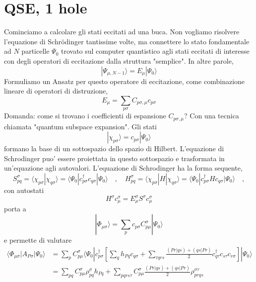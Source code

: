\documentclass{report}
\begin{document}
\section{QSE, 1 hole}

{\color{red}
Cominciamo a calcolare gli stati eccitati ad una buca. Non vogliamo risolvere l'equazione di Schr\"{o}dinger tantissime volte, ma connettere lo stato fondamentale
ad $N$ particelle $\Psi_0$ trovato sul computer quantistico agli stati eccitati di interesse con degli operatori di eccitazione dalla struttura "semplice". In altre parole,
\begin{equation}
| \Psi_{\mu,N-1} \rangle = E_\mu | \Psi_0 \rangle
\end{equation}
Formuliamo un Ansatz per questo operatore di eccitazione, come combinazione lineare di operatori di distruzione,
\begin{equation}
E_\mu = \sum_{p\sigma} C_{p\sigma,\mu} c_{p\sigma} %
\end{equation}
Domanda: come si trovano i coefficienti di espansione $C_{p\sigma,\mu}$? Con una tecnica chiamata "quantum subspace expansion". Gli stati
\begin{equation}
| \chi_{p\sigma} \rangle = c_{p\sigma}  | \Psi_0 \rangle
\end{equation}
formano la base di un sottospazio dello spazio di Hilbert. L'equazione di Schrodinger puo' essere proiettata in questo sottospazio e trasformata in un'equazione
agli autovalori.
}
L'equazione di Schrodinger ha la forma sequente,
\begin{equation}
S^\sigma_{pq} = \langle \chi_{p\sigma} | \chi_{q\sigma} \rangle = \langle \Psi_0 | c^\dagger_{p\sigma} c_{q\sigma} | \Psi_0 \rangle
\quad,\quad
H^\sigma_{pq} = \langle \chi_{p\sigma} | H | \chi_{q\sigma} \rangle = \langle \Psi_0 | c^\dagger_{p\sigma} H c_{q\sigma} | \Psi_0 \rangle
\quad,
\end{equation}
con autostati
\begin{equation}
H^\sigma c_\mu^\sigma = E^\sigma_\mu S^\sigma c_\mu^\sigma
\end{equation}
porta a
\begin{equation}
| \Phi_{\mu\sigma} \rangle = \sum_p c_{p\sigma} C_{p\mu}^\sigma | \Psi_0 \rangle 
\end{equation}
e permette di valutare
\begin{equation}
\begin{split}
\langle \Phi_{\mu\sigma} | A_{P\sigma} | \Psi_0 \rangle 
&= \sum_p C_{p\mu}^\sigma \langle \Psi_0 | c^\dagger_{p\sigma} 
\left[ \sum_{q} h_{Pq} c_{q\sigma} + \sum_{\tau qrs} \frac{(Pr|qs)+(qs|Pr)}{2} c^\dagger_{q\tau} c_{s\tau} c_{r\sigma} \right] | \Psi_0 \rangle \\
&=
\sum_{pq} C_{p\mu}^\sigma \rho_{pq}^\sigma h_{Pq} 
+ 
\sum_{pqrs \tau} C_{p\mu}^\sigma \frac{(Pr|qs)+(qs|Pr)}{2} \rho_{prqs}^{\sigma \tau}
\end{split}
\end{equation}
\end{document}
